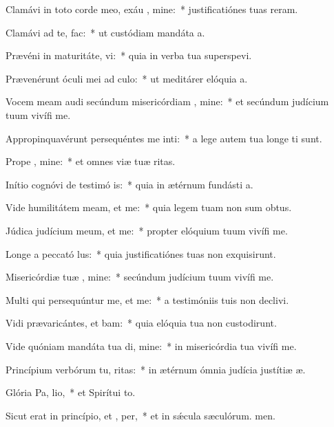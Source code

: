 \item Clamávi in toto corde meo, exáu , mine:~* justificatiónes tuas reram.
\item Clamávi ad te,   fac:~* ut custódiam mandáta a.
\item Prævéni in maturitáte,  vi:~* quia in verba tua superspevi.
\item Prævenérunt óculi mei ad  culo:~* ut meditárer elóquia a.
\item Vocem meam audi secúndum misericórdiam , mine:~* et secúndum judícium tuum vivífi me.
\item Appropinquavérunt persequéntes me inti:~* a lege autem tua longe ti sunt.
\item Prope  , mine:~* et omnes viæ tuæ ritas.
\item Inítio cognóvi de testimó is:~* quia in ætérnum fundásti a.
\item Vide humilitátem meam, et  me:~* quia legem tuam non sum obtus.
\item Júdica judícium meum, et  me:~* propter elóquium tuum vivífi me.
\item Longe a peccató lus:~* quia justificatiónes tuas non exquisirunt.
\item Misericórdiæ tuæ , mine:~* secúndum judícium tuum vivífi me.
\item Multi qui persequúntur me, et  me:~* a testimóniis tuis non declivi.
\item Vidi prævaricántes, et bam:~* quia elóquia tua non custodirunt.
\item Vide quóniam mandáta tua di, mine:~* in misericórdia tua vivífi me.
\item Princípium verbórum tu, ritas:~* in ætérnum ómnia judícia justítiæ æ.
\item Glória Pa,  lio,~* et Spirítui to.
\item Sicut erat in princípio, et ,  per,~* et in sǽcula sæculórum. men.
